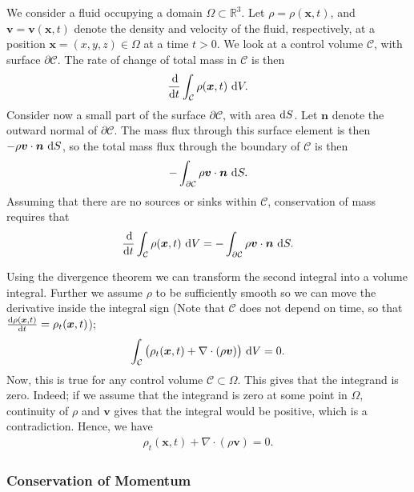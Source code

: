 \documentclass[12pt]{article}
\begin{document}
We consider a fluid occupying a domain $\Omega \subset \mathbb{R}^3$. Let $\rho = \rho(\bm{x}, t)$, and
$\bm{v} = \bm{v}(\bm{x},t)$ denote the density and velocity of the fluid, respectively, at a position
$\bm{x} = (x,y,z) \in \Omega$ at a time $t > 0$. We look at a control volume $\mathcal{C}$, with surface $\partial \mathcal{C}$.
The rate of change of total mass in $\mathcal{C}$ is then
\begin{align}
    \frac{\operatorname{d}\!}{\operatorname{d}\! t}\int_\mathcal{C} \rho(\bm{x},t) \, \operatorname{d}\! V.
\end{align}
Consider now a small part of the surface $\partial \mathcal{C}$, with area $\operatorname{d}\! S$. Let $\bm{n}$ denote the outward normal
of $\partial \mathcal{C}$. The mass flux through this surface element is then $-\rho \bm{v} \cdot \bm{n} \, \operatorname{d}\! S$, so the
total mass flux through the boundary of $\mathcal{C}$ is then
\begin{align}
    -\int_{\partial \mathcal{C}}\rho \bm{v} \cdot \bm{n} \, \operatorname{d}\! S.
\end{align}
Assuming that there are no sources or sinks within $\mathcal{C}$, conservation of mass requires that
\begin{align}
    \frac{\operatorname{d}\!}{\operatorname{d}\! t}\int_\mathcal{C} \rho(\bm{x},t) \, \operatorname{d}\! V
                            = -\int_{\partial \mathcal{C}}\rho \bm{v} \cdot \bm{n} \, \operatorname{d}\! S.
\end{align}

Using the divergence theorem we can transform the second integral into
a volume integral. Further we assume $\rho$ to be sufficiently smooth
so we can move the derivative inside the integral sign (Note that
$\mathcal{C}$ does not depend on time, so that $\frac{\operatorname{d}\! \rho(\bm x,t)}{\operatorname{d}\!
  t}= \rho_t(\bm x, t)$);
\begin{align}
    \int_\mathcal{C} \big(\rho_t(\bm{x},t) + \nabla \cdot (\rho \bm{v}) \big) \, \operatorname{d}\! V = 0.
\end{align}
Now, this is true for any control volume $\mathcal{C} \subset \Omega$. This gives that the integrand is zero. Indeed;
if we assume that the integrand is zero at some point in $\Omega$, continuity of $\rho$ and $\bm{v}$
gives that the integral would be positive, which is a contradiction. Hence, we have
\begin{align}
    \label{eq:massConservation}
    \rho_t(\bm{x},t) + \nabla \cdot (\rho \bm{v}) = 0.
\end{align}

%
%
\subsubsection*{Conservation of Momentum}
\end{document}
